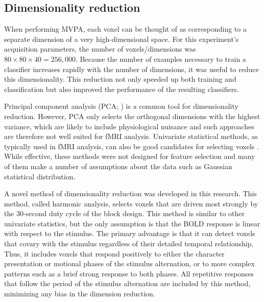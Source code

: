 \documentclass[5p,authoryear]{elsarticle}
\begin{document}
\subsection{Dimensionality reduction}
When performing MVPA, each voxel can be thought of as corresponding to a separate dimension of a very high-dimensional space.
For this experiment's acquisition parameters, the number of voxels/dimensions was $80 \times 80 \times 40 = 256,000$.
Because the number of examples necessary to train a classifier increases rapidly with the number of dimensions, it was useful to reduce this dimensionality.
This reduction not only speeded up both training and classification but also improved the performance of the resulting classifiers.

Principal component analysis (PCA; \cite{Hotelling1933}) is a common tool for dimensionality reduction.
However, PCA only selects the orthogonal dimensions with the highest variance, which are likely to include physiological nuisance and such approaches are therefore not well suited for fMRI analysis.
Univariate statistical methods, as typically used in  fMRI analysis, can also be good candidates for selecting voxels \citep{Norman2006,Pereira2009}.
While effective, these methods were not designed for feature selection and many of them make a number of assumptions about the data such as Gaussian statistical distribution.

A novel method of dimensionality reduction was developed in this research.
This method, called harmonic analysis, selects voxels that are driven most strongly by the 30-second duty cycle of the block design.
This method is similar to other univariate statistics, but the only assumption is that the BOLD response is linear with respect to the stimulus.
The primary advantage is that it can detect voxels that covary with the stimulus regardless of their detailed temporal relationship. 
Thus, it includes voxels that respond positively to either the character presentation or motional phases of the stimulus alternation, or to more complex patterns such as a brief strong response to both phases. 
All repetitive responses that follow the period of the stimulus alternation are included by this method, minimizing any bias in the dimension reduction.
\end{document}
